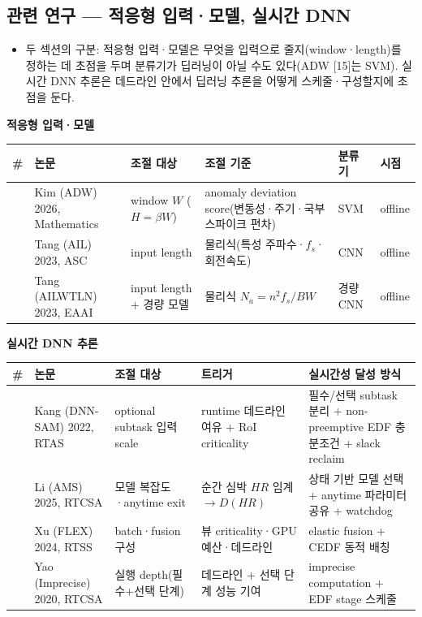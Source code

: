 \documentclass[10pt]{article}
\begin{document}
\subsection{관련 연구 --- 적응형 입력·모델, 실시간 DNN}
\begin{itemize}
\item 두 섹션의 구분: 적응형 입력·모델은 무엇을 입력으로 줄지(window·length)를 정하는 데 초점을 두며 분류기가 딥러닝이 아닐 수도 있다(ADW [15]는 SVM). 실시간 DNN 추론은 데드라인 안에서 딥러닝 추론을 어떻게 스케줄·구성할지에 초점을 둔다.
\end{itemize}
\noindent\textbf{적응형 입력·모델}
\begin{center}\scriptsize
\begin{tabular}{@{}cL{2.5cm}L{2.4cm}L{3.8cm}L{1.4cm}L{1.4cm}@{}}
\toprule
\# & 논문 & 조절 대상 & 조절 기준 & 분류기 & 시점 \\ \midrule
[15] & Kim (ADW) 2026, Mathematics & window $W$ ($H=\beta W$) & anomaly deviation score(변동성·주기·국부 스파이크 편차) & SVM & offline \\
[16] & Tang (AIL) 2023, ASC & input length & 물리식(특성 주파수·$f_s$·회전속도) & CNN & offline \\
[17] & Tang (AILWTLN) 2023, EAAI & input length + 경량 모델 & 물리식 $N_a=n^2 f_s/BW$ & 경량 CNN & offline \\
\bottomrule
\end{tabular}
\end{center}
\noindent\textbf{실시간 DNN 추론}
\begin{center}\scriptsize
\begin{tabular}{@{}cL{2.4cm}L{2.6cm}L{3.0cm}L{4.2cm}@{}}
\toprule
\# & 논문 & 조절 대상 & 트리거 & 실시간성 달성 방식 \\ \midrule
[18] & Kang (DNN-SAM) 2022, RTAS & optional subtask 입력 scale & runtime 데드라인 여유 + RoI criticality & 필수/선택 subtask 분리 + non-preemptive EDF 충분조건 + slack reclaim \\
[19] & Li (AMS) 2025, RTCSA & 모델 복잡도·anytime exit & 순간 심박 $HR$ 임계 $\rightarrow D(HR)$ & 상태 기반 모델 선택 + anytime 파라미터 공유 + watchdog \\
[20] & Xu (FLEX) 2024, RTSS & batch·fusion 구성 & 뷰 criticality·GPU 예산·데드라인 & elastic fusion + CEDF 동적 배칭 \\
[21] & Yao (Imprecise) 2020, RTCSA & 실행 depth(필수+선택 단계) & 데드라인 + 선택 단계 성능 기여 & imprecise computation + EDF stage 스케줄 \\
\bottomrule
\end{tabular}
\end{center}
\end{document}
